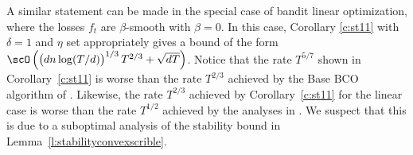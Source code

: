 %
\begin{remark}
A similar statement can be made in the special case of bandit linear optimization, where the losses $f_t$ are $\beta$-smooth with $\beta =0$. In this case, 
Corollary \ref{c:st11} with $\delta = 1$ and $\eta$ set appropriately gives a bound of the form $\scO\left(\bigl(dn\log (T/d)\bigl)^{1/3}\,T^{2/3} + \sqrt{dT}\right)$. Notice that the rate $T^{5/7}$ shown in Corollary~\ref{c:st11} is worse than the rate $T^{2/3}$ achieved by the Base BCO algorithm of \citet{st11}. Likewise, the rate $T^{2/3}$ achieved by Corollary~\ref{c:st11} for the linear case is worse than the rate $T^{1/2}$ achieved by the analyses in \citep{ahr12,st11}. We suspect that this is due to a suboptimal analysis of the stability bound in Lemma~\ref{l:stabilityconvexscrible}.
\end{remark}

